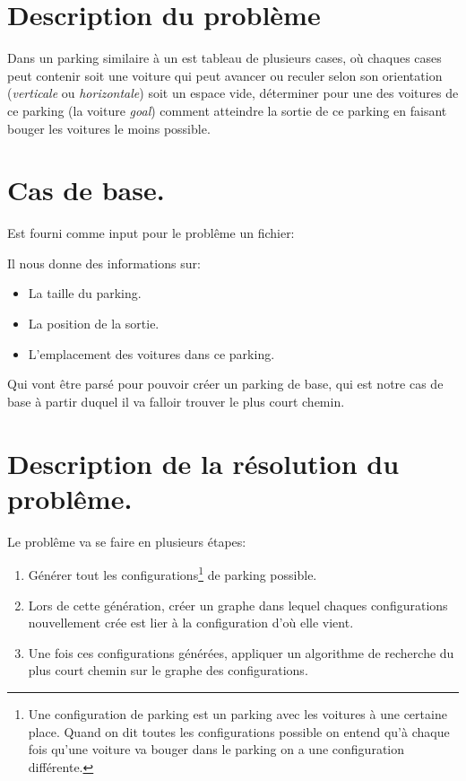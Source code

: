 \documentclass[10pt, a4paper]{article}
\begin{document}
\section{Description du problème}
    Dans un parking similaire à un est tableau de plusieurs cases,
    où chaques cases peut contenir soit une voiture qui peut avancer
    ou reculer selon son orientation (\emph{verticale} ou \emph{horizontale})
    soit un espace vide, déterminer pour une des voitures de ce parking
    (la voiture \emph{goal}) comment atteindre la sortie de ce parking en
    faisant bouger les voitures le moins possible.

\section{Cas de base.}
    Est fourni comme input pour le problême un fichier: \newline
    
    Il nous donne des informations sur:
    \begin{itemize}
        \item La taille du parking.
        \item La position de la sortie.
        \item L'emplacement des voitures dans ce parking.
    \end{itemize}
    Qui vont être parsé pour pouvoir créer un parking de base, qui est notre
    cas de base à partir duquel il va falloir trouver le plus court chemin.

\section{Description de la résolution du problême.}
    Le problême va se faire en plusieurs étapes:
    \begin{enumerate}
        \item Générer tout les configurations\footnote{Une configuration de
            parking est un parking avec les voitures à une certaine place.
            Quand on dit toutes les configurations possible on entend
            qu'à chaque fois qu'une voiture va bouger dans le parking on a une
            configuration différente.} de parking possible.
        \item Lors de cette génération, créer un graphe dans lequel chaques
            configurations nouvellement crée est lier à la configuration
            d'où elle vient.
        \item Une fois ces configurations générées, appliquer un algorithme de
            recherche du plus court chemin sur le graphe des configurations.
    \end{enumerate}
\end{document}
